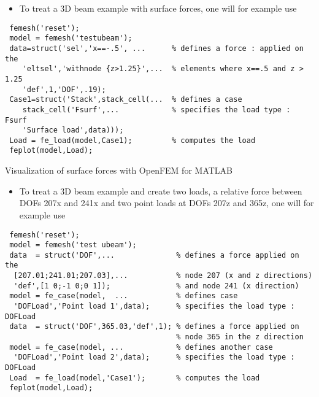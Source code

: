 \begin{itemize}
\item To treat a 3D beam example with surface forces, one will for example use
\end{itemize}
\vspace{-0.5cm}
\begin{verbatim}
 femesh('reset');
 model = femesh('testubeam');
 data=struct('sel','x==-.5', ...      % defines a force : applied on the
    'eltsel','withnode {z>1.25}',...  % elements where x==.5 and z > 1.25 
    'def',1,'DOF',.19);
 Case1=struct('Stack',stack_cell(...  % defines a case
    stack_cell('Fsurf',...            % specifies the load type : Fsurf
    'Surface load',data))); 
 Load = fe_load(model,Case1);         % computes the load  
 feplot(model,Load);

\end{verbatim}


\begin{center}
\begin{figure}[H]
\centering
{} %
\end{figure}

Visualization of surface forces with OpenFEM for MATLAB
\end{center}

\begin{itemize}
\item To treat a 3D beam example and create two loads, a relative force between DOFs 207x and 241x and two point loads at DOFs 207z and 365z, one will for example use
\end{itemize}
\vspace{-0.5cm}
\begin{verbatim}
 femesh('reset');
 model = femesh('test ubeam');
 data  = struct('DOF',...              % defines a force applied on the
  [207.01;241.01;207.03],...           % node 207 (x and z directions)
  'def',[1 0;-1 0;0 1]);               % and node 241 (x direction)
 model = fe_case(model,  ...           % defines case
  'DOFLoad','Point load 1',data);      % specifies the load type : DOFLoad
 data  = struct('DOF',365.03,'def',1); % defines a force applied on
                                       % node 365 in the z direction
 model = fe_case(model, ...            % defines another case
  'DOFLoad','Point load 2',data);      % specifies the load type : DOFLoad
 Load  = fe_load(model,'Case1');       % computes the load
 feplot(model,Load);
\end{verbatim}

